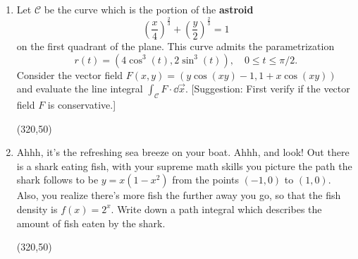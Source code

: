 \documentclass[12pt]{exam}
\newcommand{\cC}{\mathcal{C}}
\begin{document}
\begin{enumerate} 

\item Let $\cC$ be the curve which is the portion of the \textbf{astroid}
$$\left(\frac{x}{4}\right)^{\frac23}+\left(\frac{y}{2}\right)^{\frac23}=1$$
on the first quadrant of the plane. This curve admits the parametrization
$$r(t)=(4\cos^3(t),2\sin^3(t)),\quad 0\leq t\leq \pi/2.$$
Consider the vector field $F(x,y)=(y\cos(xy)-1,1+x\cos(xy))$ and evaluate the line integral $\int_{\cC}F\cdot\dd\vec{x}$. [Suggestion: First verify if the vector field $F$ is conservative.]
\begin{flushleft}
\end{flushleft}
\begin{flushright}
\framebox(320,50){}
\end{flushright}

\item Ahhh, it's the refreshing sea breeze on your boat. Ahhh, and look! Out there is a shark eating fish, with your supreme math skills you picture the path the shark follows to be $y=x(1-x^2)$ from the points $(-1,0)$ to $(1,0)$. Also, you realize there's more fish the further away you go, so that the fish density is $f(x)=2^x$. Write down a path integral which describes the amount of fish eaten by the shark.
\begin{flushleft}
\end{flushleft}
\begin{flushright}
\framebox(320,50){}
\end{flushright}

\newpage


\end{enumerate}
\end{document}

